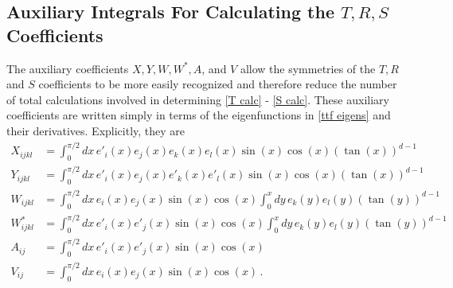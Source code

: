\documentclass[../PhD.tex]{subfiles}
\begin{document}
\begin{subappendices}

\section{Auxiliary Integrals For Calculating the $T, R, S$ Coefficients}
\label{app: integrals}

The auxiliary coefficients $X, Y, W, W^*, A$, and $V$ allow the symmetries of the $T, R$ and $S$ coefficients to be more easily recognized and therefore reduce the number of total calculations involved in determining \eqref{T calc} - \eqref{S calc}. These auxiliary coefficients are written simply in terms of the eigenfunctions in \eqref{ttf eigens} and their derivatives. Explicitly, they are
\begin{align}
\label{X int}
X_{ijkl} &= \int^{\pi/2}_0 dx \, e'_i(x) e_j(x) e_k(x) e_l(x) \sin(x) \cos(x) \left( \tan(x) \right)^{d-1} \\
\label{Y int}
Y_{ijkl} &= \int^{\pi/2}_0 dx \, e'_i(x) e_j(x) e'_k(x) e'_l(x) \sin(x) \cos(x) \left( \tan(x) \right)^{d-1} \\
\label{W int}
W_{ijkl} &= \int^{\pi/2}_0 dx \, e_i(x) e_j(x) \sin(x) \cos(x) \int^x_0 dy \, e_k(y) e_l(y) \left( \tan(y) \right)^{d-1} \\
\label{W* int}
W^*_{ijkl} &= \int^{\pi/2}_0 dx \, e'_i(x) e'_j(x) \sin(x) \cos(x) \int^x_0 dy \, e_k(y) e_l(y) \left( \tan(y) \right)^{d-1} \\
\label{A int}
A_{ij} &= \int^{\pi/2}_0 dx \, e'_i(x) e'_j(x) \sin(x) \cos(x) \\
\label{V int}
V_{ij} &= \int^{\pi/2}_0 dx \, e_i(x) e_j(x) \sin(x) \cos(x) \, .
\end{align}


\end{subappendices}
\end{document}
